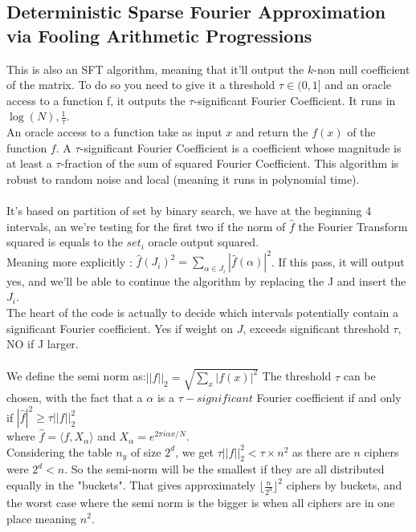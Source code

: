 \documentclass{article}
\begin{document}
\subsection{Deterministic Sparse Fourier Approximation via Fooling Arithmetic Progressions}
This is also an SFT algorithm, meaning that it'll output the $k$-non null coefficient of the matrix. To do so you need to give it a threshold $\tau \in (0,1]$ and an oracle access to a function f, it outputs the $\tau$-significant Fourier Coefficient. It runs in $\log(N),\frac{1}{\tau}$.\\
An oracle access to a function take as input $x$ and return the $f(x)$ of the function $f$. A $\tau$-significant Fourier Coefficient is a coefficient whose magnitude is at least a $\tau$-fraction of the sum of squared Fourier Coefficient. This algorithm is robust to random noise and local (meaning it runs in polynomial time).\\
\\
It's based on partition of set by binary search, we have at the beginning 4 intervals, an we're testing for the first two if the norm of $\hat{f}$ the Fourier Transform squared is equals to the $set_i$ oracle output squared.\\
Meaning more explicitly : $\hat{f}(J_i)^2 = \sum_{\alpha \in J_i}{|\hat{f}(\alpha)|^2}$. If this pass, it will output yes, and we'll be able to continue the algorithm by replacing the J and insert the $J_i$.\\
The heart of the code is actually to decide which intervals potentially contain a significant Fourier coefficient. Yes if weight on $J$, exceeds significant threshold $\tau$, NO if J larger.\\
\\
We define the semi norm as:$||f||_2 = \sqrt{\sum_{x}{|f(x)|^2}}$
The threshold $\tau$ can be chosen, with the fact that a $\alpha$ is a $\tau-significant$ Fourier coefficient if and only if $|\hat{f}|^2 \geq \tau||f||^{2}_2$\\ where $\hat{f} = \langle f,X_{\alpha} \rangle$ and $X_{\alpha} = e^{2\pi i \alpha x/N}$.\\
Considering the table $n_y$ of size $2^d$, we get $\tau||f||^{2}_2 < \tau \times n^2$ as there are $n$ ciphers were $2^d <n$. So the semi-norm will be the smallest if they are all distributed equally in the "buckets". That gives approximately ${\lfloor \frac{n}{2^d} \rfloor}^{2}$ ciphers by buckets, and the worst case where the semi norm is the bigger is when all ciphers are in one place meaning $n^2$.\\
\end{document}

